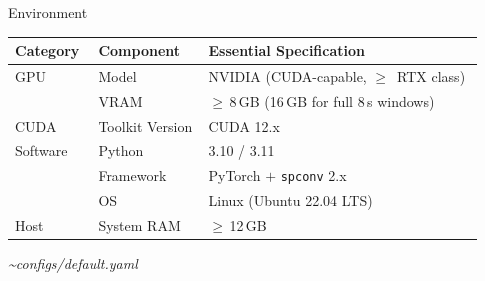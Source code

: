 \documentclass[aspectratio=169,11pt]{beamer}
\newcommand{\srctag}[1]{{\footnotesize\itshape\color{mutedgray}\textasciitilde#1}}
\begin{document}
\begin{frame}{Environment}
  \vspace{0.3em}
  \centering
  \begin{darkbox}[width=0.92\paperwidth]
    \renewcommand{\arraystretch}{1.3}
    \begin{tabular}{p{0.16\linewidth}p{0.22\linewidth}p{0.55\linewidth}}
      \textbf{Category} & \textbf{Component} & \textbf{Essential Specification}\\
      \hline
      GPU       & Model           & NVIDIA (CUDA-capable, $\ge$~RTX class)\\
                & VRAM            & $\ge$\,8\,GB (16\,GB for full 8\,s windows)\\
      CUDA      & Toolkit Version & CUDA 12.x\\
      Software  & Python          & 3.10 / 3.11\\
                & Framework       & PyTorch $+$ \texttt{spconv} 2.x\\
                & OS              & Linux (Ubuntu 22.04 LTS)\\
      Host      & System RAM      & $\ge$\,12\,GB\\
    \end{tabular}
  \end{darkbox}
  \vspace{0.3em}
  \hfill\srctag{configs/default.yaml}
\end{frame}
\end{document}
